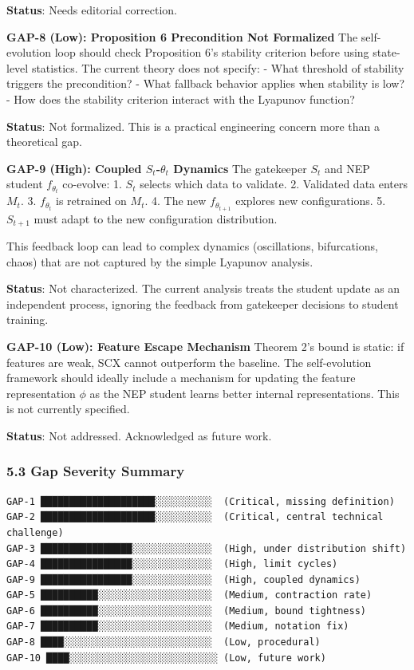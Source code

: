 \documentclass[
  12pt,
]{ctexart}
\begin{document}
\textbf{Status}: Needs editorial correction.

\textbf{GAP-8 (Low): Proposition 6 Precondition Not Formalized} The
self-evolution loop should check Proposition 6's stability criterion
before using state-level statistics. The current theory does not
specify: - What threshold of stability triggers the precondition? - What
fallback behavior applies when stability is low? - How does the
stability criterion interact with the Lyapunov function?

\textbf{Status}: Not formalized. This is a practical engineering concern
more than a theoretical gap.

\textbf{GAP-9 (High): Coupled \(S_t\)-\(\theta_t\) Dynamics} The
gatekeeper \(S_t\) and NEP student \(f_{\theta_t}\) co-evolve: 1.
\(S_t\) selects which data to validate. 2. Validated data enters
\(M_t\). 3. \(f_{\theta_t}\) is retrained on \(M_t\). 4. The new
\(f_{\theta_{t+1}}\) explores new configurations. 5. \(S_{t+1}\) must
adapt to the new configuration distribution.

This feedback loop can lead to complex dynamics (oscillations,
bifurcations, chaos) that are not captured by the simple Lyapunov
analysis.

\textbf{Status}: Not characterized. The current analysis treats the
student update as an independent process, ignoring the feedback from
gatekeeper decisions to student training.

\textbf{GAP-10 (Low): Feature Escape Mechanism} Theorem 2's bound is
static: if features are weak, SCX cannot outperform the baseline. The
self-evolution framework should ideally include a mechanism for updating
the feature representation \(\phi\) as the NEP student learns better
internal representations. This is not currently specified.

\textbf{Status}: Not addressed. Acknowledged as future work.

\subsubsection{5.3 Gap Severity Summary}\label{gap-severity-summary}

\begin{verbatim}
GAP-1 ████████████████████░░░░░░░░░░  (Critical, missing definition)
GAP-2 ████████████████████░░░░░░░░░░  (Critical, central technical challenge)
GAP-3 ████████████████░░░░░░░░░░░░░░  (High, under distribution shift)
GAP-4 ████████████████░░░░░░░░░░░░░░  (High, limit cycles)
GAP-9 ████████████████░░░░░░░░░░░░░░  (High, coupled dynamics)
GAP-5 ██████████░░░░░░░░░░░░░░░░░░░░  (Medium, contraction rate)
GAP-6 ██████████░░░░░░░░░░░░░░░░░░░░  (Medium, bound tightness)
GAP-7 ██████████░░░░░░░░░░░░░░░░░░░░  (Medium, notation fix)
GAP-8 ████░░░░░░░░░░░░░░░░░░░░░░░░░░  (Low, procedural)
GAP-10 ████░░░░░░░░░░░░░░░░░░░░░░░░░░ (Low, future work)
\end{verbatim}
\end{document}
